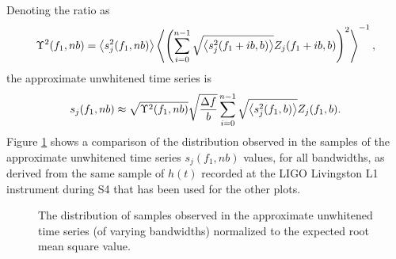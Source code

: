 \documentclass{article}
\begin{document}
Denoting the ratio as
\begin{equation}
\Upsilon^{2}(f_{1}, n b)
   = \left\langle s_{j}^{2}(f_{1}, n b)\right\rangle \left\langle\left( \sum_{i = 0}^{n -1}
   \sqrt{\left\langle s_{j}^{2}(f_{1} + i b, b)\right\rangle} Z_{j}(f_{1} + i b, b)
   \right)^{2}\right\rangle^{-1},
\end{equation}
the approximate unwhitened time series is
\begin{equation}
s_{j}(f_{1}, n b)
   \approx \sqrt{\Upsilon^{2}(f_{1}, n b)} \sqrt{\frac{\Delta f}{b}}
   \sum_{i = 0}^{n -1} \sqrt{\left\langle s_{j}^{2}(f_{1}, b)\right\rangle} Z_{j}(f_{1}, b).
\end{equation}
Figure \ref{fig:sjhistogram} shows a comparison of the distribution
observed in the samples of the approximate unwhitened time series
\(s_{j}(f_{1}, n b)\) values, for all bandwidths, as derived from the same
sample of \(h(t)\) recorded at the LIGO Livingston L1 instrument during S4
that has been used for the other plots.
\begin{figure}
\begin{center}
\end{center}
\caption{The distribution of samples observed in the approximate unwhitened
time series (of varying bandwidths) normalized to the expected root mean
square value.}
\label{fig:sjhistogram}
\end{figure}
\end{document}
